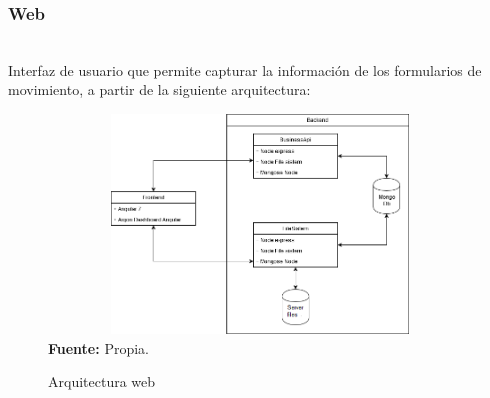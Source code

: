 \subsubsection{Web}\mbox{} \\
\label{ins:UI:web}
Interfaz de usuario que permite capturar la informaci\'on de los formularios de movimiento, a partir de la siguiente arquitectura:
\begin{figure}[H]
	\caption{Arquitectura web}
	\label{fig:architectureWeb}
	\centering
	\includegraphics[width=430px,height=220px]{graphics/webArchitecture.PNG} \\
	\textbf{Fuente:} Propia.
\end{figure}
